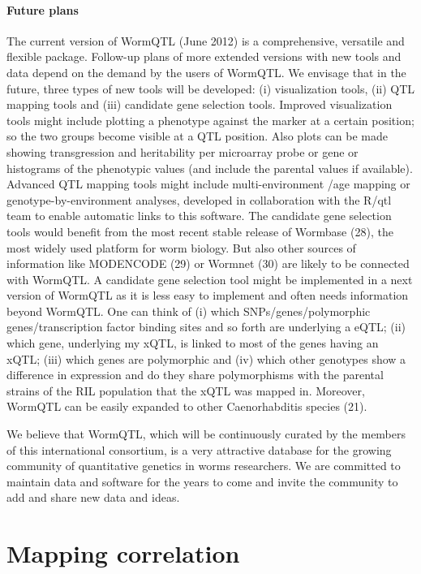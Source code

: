 \documentclass[8pt, twoside, a5paper]{report}
\begin{document}
\subsubsection{Future plans}
The current version of WormQTL (June 2012) is a comprehensive, versatile and flexible package. Follow-up plans of more extended 
versions with new tools and data depend on the demand by the users of WormQTL. We envisage that in the future, three types of 
new tools will be developed: (i) visualization tools, (ii) QTL mapping tools and (iii) candidate gene selection tools. Improved 
visualization tools might include plotting a phenotype against the marker at a certain position; so the two groups become visible 
at a QTL position. Also plots can be made showing transgression and heritability per microarray probe or gene or histograms of 
the phenotypic values (and include the parental values if available). Advanced QTL mapping tools might include multi-environment
/age mapping or genotype-by-environment analyses, developed in collaboration with the R/qtl team to enable automatic links to 
this software. The candidate gene selection tools would benefit from the most recent stable release of Wormbase (28), the most 
widely used platform for worm biology. But also other sources of information like MODENCODE (29) or Wormnet (30) are likely to 
be connected with WormQTL. A candidate gene selection tool might be implemented in a next version of WormQTL as it is less easy 
to implement and often needs information beyond WormQTL. One can think of (i) which SNPs/genes/polymorphic genes/transcription 
factor binding sites and so forth are underlying a eQTL; (ii) which gene, underlying my xQTL, is linked to most of the genes 
having an xQTL; (iii) which genes are polymorphic and (iv) which other genotypes show a difference in expression and do they 
share polymorphisms with the parental strains of the RIL population that the xQTL was mapped in. Moreover, WormQTL can be easily 
expanded to other Caenorhabditis species (21).

We believe that WormQTL, which will be continuously curated by the members of this international consortium, is a very 
attractive database for the growing community of quantitative genetics in worms researchers. We are committed to maintain data 
and software for the years to come and invite the community to add and share new data and ideas.

\chapter{Mapping correlation}
\end{document}
